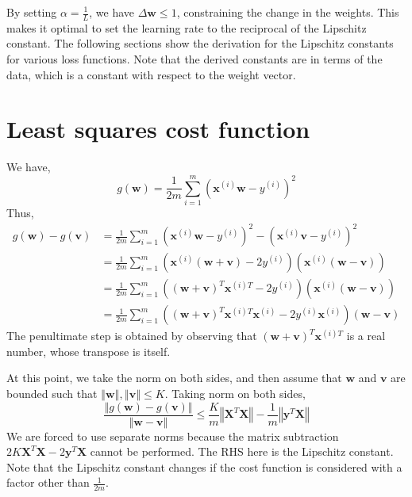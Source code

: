 \documentclass{article}
\begin{document}
By setting $\alpha = \frac{1}{L}$, we have $\Delta \textbf{w} \leq 1$, constraining the change in the weights. This makes it optimal to set the learning rate to the reciprocal of the Lipschitz constant. The following sections show the derivation for the Lipschitz constants for various loss functions. Note that the derived constants are in terms of the data, which is a constant with respect to the weight vector. 

\section{Least squares cost function} \label{lstsq}
We have,
\[
    g(\textbf{w}) = \frac{1}{2m}\sum\limits_{i=1}^m \left(\textbf{x}^{(i)} \textbf{w} - y^{(i)}\right)^2
\]
Thus,
\[
    \begin{aligned}
        g(\textbf{w}) - g(\textbf{v}) &= \frac{1}{2m}\sum\limits_{i=1}^m \left(\textbf{x}^{(i)} \textbf{w} - y^{(i)}\right)^2 - \left(\textbf{x}^{(i)} \textbf{v} - y^{(i)}\right)^2 \\
        &= \frac{1}{2m}\sum\limits_{i=1}^m \left( \textbf{x}^{(i)}(\textbf{w}+\textbf{v}) - 2y^{(i)}\right) \left( \textbf{x}^{(i)} (\textbf{w}-\textbf{v}) \right) \\
        &= \frac{1}{2m}\sum\limits_{i=1}^m \left( (\textbf{w}+\textbf{v})^T \textbf{x}^{(i)T} - 2y^{(i)}\right) \left( \textbf{x}^{(i)} (\textbf{w}-\textbf{v}) \right) \\
        &= \frac{1}{2m}\sum\limits_{i=1}^m \left( (\textbf{w} + \textbf{v})^T \textbf{x}^{(i)T}\textbf{x}^{(i)} - 2y^{(i)}\textbf{x}^{(i)} \right) (\textbf{w}-\textbf{v}) 
    \end{aligned}
\]
The penultimate step is obtained by observing that $(\textbf{w}+\textbf{v})^T \textbf{x}^{(i)T}$ is a real number, whose transpose is itself.

At this point, we take the norm on both sides, and then assume that $\textbf{w}$ and $\textbf{v}$ are bounded such that $\left\Vert \textbf{w} \right\Vert, \left\Vert \textbf{v} \right\Vert \leq K$. Taking norm on both sides,
\[
    \boxed{
        \frac{\left\Vert g(\textbf{w}) - g(\textbf{v}) \right\Vert}{\left\Vert \textbf{w} - \textbf{v} \right\Vert} \leq \frac{K}{m}\left\Vert \textbf{X}^T\textbf{X} \right\Vert - \frac{1}{m} \left\Vert\textbf{y}^T \textbf{X} \right\Vert
    }
\]
We are forced to use separate norms because the matrix subtraction $2K \textbf{X}^T\textbf{X} - 2\textbf{y}^T \textbf{X}$ cannot be performed. 
The RHS here is the Lipschitz constant. Note that the Lipschitz constant changes if the cost function is considered with a factor other than $\frac{1}{2m}$.
\end{document}
